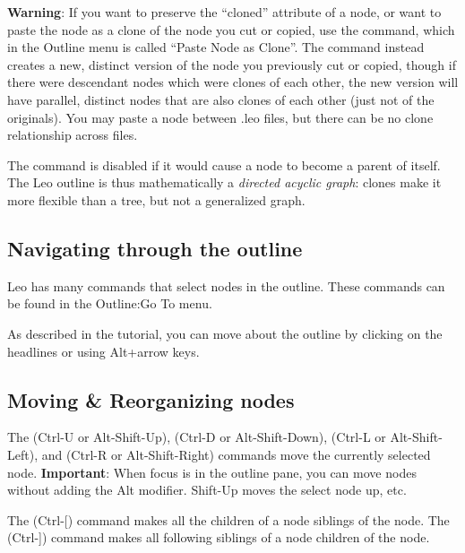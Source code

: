\documentclass[a4paper,10pt,english]{sphinxmanual}
\begin{document}
\textbf{Warning}: If you want to preserve the ``cloned'' attribute of a node, or
want to paste the node as a clone of the node you cut or copied, use the
 command, which in the Outline menu is called
``Paste Node as Clone''. The  command instead creates a new,
distinct version of the node you previously cut or copied, though if there
were descendant nodes which were clones of each other, the new version will
have parallel, distinct nodes that are also clones of each other (just not
of the originals). You may paste a node between .leo files, but there can
be no clone relationship across files.

The  command is disabled if it would cause a node
to become a parent of itself. The Leo outline is thus mathematically a
\emph{directed acyclic graph}: clones make it more flexible than a tree, but not
a generalized graph.


\subsection{Navigating through the outline}
\label{commands:navigating-through-the-outline}
Leo has many commands that select nodes in the outline. These commands can be
found in the Outline:Go To menu.

As described in the tutorial, you can move about the outline by clicking on the
headlines or using Alt+arrow keys.


\subsection{Moving \& Reorganizing nodes}
\label{commands:moving-reorganizing-nodes}
The  (Ctrl-U or Alt-Shift-Up), 
(Ctrl-D or Alt-Shift-Down),  (Ctrl-L or
Alt-Shift-Left), and  (Ctrl-R or Alt-Shift-Right)
commands move the currently selected node. \textbf{Important}: When focus is in
the outline pane, you can move nodes without adding the Alt modifier.
Shift-Up moves the select node up, etc.

The  (Ctrl-{[}) command makes all the children of
a node siblings of the node. The  (Ctrl-{]}) command makes all following
siblings of a node children of the node.
\end{document}
